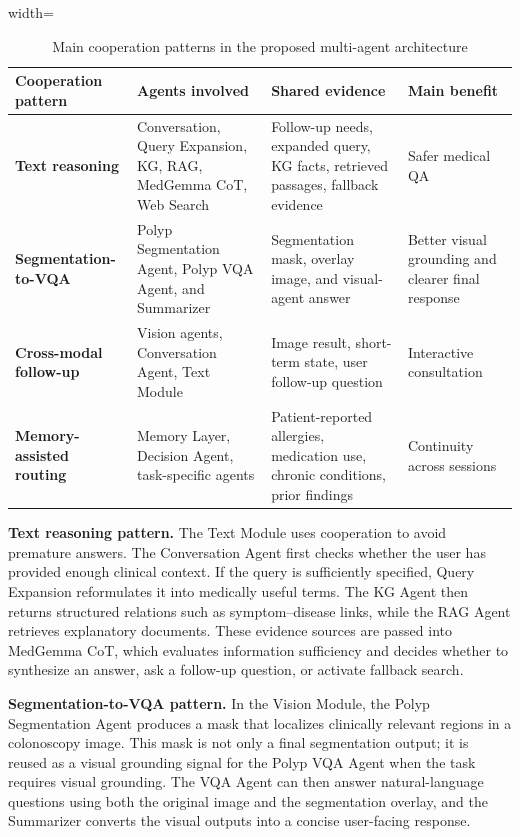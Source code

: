 \begin{table}[H]
\centering
\begin{adjustbox}{width=\textwidth}
\begin{tabular}{>{\RaggedRight\arraybackslash}p{} >{\RaggedRight\arraybackslash}p{} >{\RaggedRight\arraybackslash}p{} >{\RaggedRight\arraybackslash}p{}}
\hline\hline
\textbf{Cooperation pattern} & \textbf{Agents involved} & \textbf{Shared evidence} & \textbf{Main benefit} \\
\hline
\textbf{Text reasoning} & Conversation, Query Expansion, KG, RAG, MedGemma CoT, Web Search & Follow-up needs, expanded query, KG facts, retrieved passages, fallback evidence & Safer medical QA \\
\textbf{Segmentation-to-VQA} & Polyp Segmentation Agent, Polyp VQA Agent, and Summarizer & Segmentation mask, overlay image, and visual-agent answer & Better visual grounding and clearer final response \\
\textbf{Cross-modal follow-up} & Vision agents, Conversation Agent, Text Module & Image result, short-term state, user follow-up question & Interactive consultation \\
\textbf{Memory-assisted routing} & Memory Layer, Decision Agent, task-specific agents & Patient-reported allergies, medication use, chronic conditions, prior findings & Continuity across sessions \\
\hline\hline
\end{tabular}
\end{adjustbox}
\caption{Main cooperation patterns in the proposed multi-agent architecture}
\label{table:agent-cooperation-patterns}
\end{table}

\textbf{Text reasoning pattern.} The Text Module uses cooperation to avoid premature answers. The Conversation Agent first checks whether the user has provided enough clinical context. If the query is sufficiently specified, Query Expansion reformulates it into medically useful terms. The KG Agent then returns structured relations such as symptom--disease links, while the RAG Agent retrieves explanatory documents. These evidence sources are passed into MedGemma CoT, which evaluates information sufficiency and decides whether to synthesize an answer, ask a follow-up question, or activate fallback search.

\textbf{Segmentation-to-VQA pattern.} In the Vision Module, the Polyp Segmentation Agent produces a mask that localizes clinically relevant regions in a colonoscopy image. This mask is not only a final segmentation output; it is reused as a visual grounding signal for the Polyp VQA Agent when the task requires visual grounding. The VQA Agent can then answer natural-language questions using both the original image and the segmentation overlay, and the Summarizer converts the visual outputs into a concise user-facing response.

